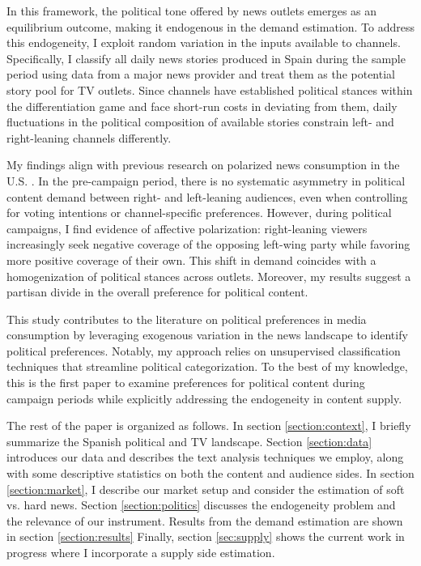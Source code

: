 \documentclass[12pt]{article}
\begin{document}
In this framework, the political tone offered by news outlets emerges as an equilibrium outcome, making it endogenous in the demand estimation. To address this endogeneity, I exploit random variation in the inputs available to channels. Specifically, I classify all daily news stories produced in Spain during the sample period using data from a major news provider and treat them as the potential story pool for TV outlets. Since channels have established political stances within the differentiation game and face short-run costs in deviating from them, daily fluctuations in the political composition of available stories constrain left- and right-leaning channels differently.

My findings align with previous research on polarized news consumption in the U.S. \citep{Peterson2017Echo}. In the pre-campaign period, there is no systematic asymmetry in political content demand between right- and left-leaning audiences, even when controlling for voting intentions or channel-specific preferences. However, during political campaigns, I find evidence of affective polarization: right-leaning viewers increasingly seek negative coverage of the opposing left-wing party while favoring more positive coverage of their own. This shift in demand coincides with a homogenization of political stances across outlets. Moreover, my results suggest a partisan divide in the overall preference for political content.

This study contributes to the literature on political preferences in media consumption by leveraging exogenous variation in the news landscape to identify political preferences. Notably, my approach relies on unsupervised classification techniques that streamline political categorization. To the best of my knowledge, this is the first paper to examine preferences for political content during campaign periods while explicitly addressing the endogeneity in content supply.



	
	The rest of the paper is organized as follows. In section \ref{section:context}, I briefly summarize the Spanish political and TV landscape. Section \ref{section:data} introduces our data and describes the text analysis techniques we employ, along with some descriptive statistics on both the content and audience sides. In section \ref{section:market}, I describe our market setup and consider the estimation of soft vs. hard news. Section \ref{section:politics} discusses the endogeneity problem and the relevance of our instrument. Results from the demand estimation are shown in section \ref{section:results} Finally, section \ref{sec:supply} shows the current work in progress where I incorporate a supply side estimation.
	
\end{document}
